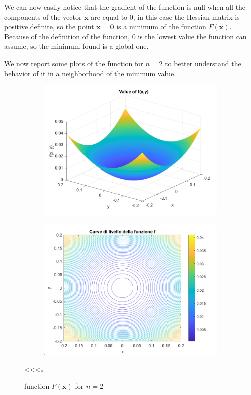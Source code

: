We can now easily notice that the gradient of the function is null when all the components of the vector $\mathbf{x}$ are equal to 0, in this case the Hessian matrix is positive definite, so the point $\mathbf{x} = \mathbf{0}$ is a minimum of the function $F(\mathbf{x})$. 
Because of the definition of the function, $0$ is the lowest value the function can assume, so the minimum found is a global one.

We now report some plots of the function for $n= 2$ to better understand the behavior of it in a neighborhood of the minimum value.
\begin{figure}[H]
    \centering
    \begin{subfigure}{0.45\textwidth}
        \centering
        \includegraphics[width=\textwidth]{img/pb76_fig.png}
        \caption{}
    \end{subfigure}
    \hspace{1cm}
    \begin{subfigure}{0.45\textwidth}
        \centering
        \includegraphics[width=\textwidth]{img/pb76_clivello.png}
        \caption{}
    \end{subfigure}
    \caption{function $F(\boldsymbol{x})$ for $n=2$}<<<s
\end{figure}

